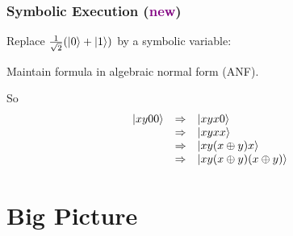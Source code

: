 \documentclass{beamer}
\newcommand{\shalf}{\frac{1}{\sqrt{2}}}
\newcommand{\pub}[1]{\textcolor{purple}{#1}}
\begin{document}
\begin{frame}
  \frametitle{Symbolic Execution (\pub{new})}
  
Replace $\shalf (\ket{0} + \ket{1})$ by a symbolic variable:

\begin{center}
\begin{yquantgroup}
\equals[$\rightsquigarrow$]
\end{yquantgroup}
\end{center}

Maintain formula in algebraic normal form (ANF).

So
\[\begin{array}{rcl}
    \ket{xy00} &\Rightarrow&
      \ket{xyx0} \\
    &\Rightarrow& 
      \ket{xyxx} \\
    &\Rightarrow& 
      \ket{xy(x\oplus y)x} \\
    &\Rightarrow& 
      \ket{xy(x\oplus y)(x\oplus y)} 
 \end{array}\]
\end{frame}

\section[Big Picture]{Big Picture}
\end{document}
